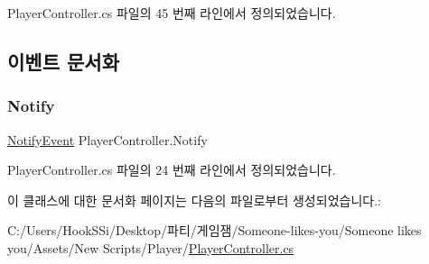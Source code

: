 Player\+Controller.\+cs 파일의 45 번째 라인에서 정의되었습니다.



\subsection{이벤트 문서화}
\mbox{\label{class_player_controller_af13292e01756741118500035511fc88d}} 
\subsubsection{\texorpdfstring{Notify}{Notify}}
{\footnotesize\ttfamily \mbox{\hyperlink{class_player_controller_a934c7f80b80276620cd60eaaeea7520e}{Notify\+Event}} Player\+Controller.\+Notify\hspace{0.3cm}{\ttfamily [static]}}



Player\+Controller.\+cs 파일의 24 번째 라인에서 정의되었습니다.



이 클래스에 대한 문서화 페이지는 다음의 파일로부터 생성되었습니다.\+:\begin{DoxyCompactItemize}
\item 
C\+:/\+Users/\+Hook\+S\+Si/\+Desktop/파티/게임잼/\+Someone-\/likes-\/you/\+Someone likes you/\+Assets/\+New Scripts/\+Player/\mbox{\hyperlink{_player_controller_8cs}{Player\+Controller.\+cs}}\end{DoxyCompactItemize}
